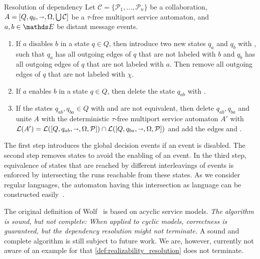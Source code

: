 \begin{definition}{Resolution of dependency}
\label{def:realizability_resolution}%
Let $\mathcal{C}=\{\mathcal{P}_{1},\ldots,\mathcal{P}_{n}\}$ be a collaboration, $A=[Q,q_{0},{\shortrightarrow},\Omega,\bigcup\mathcal{C}]$ be a $\tau$-free multiport service automaton, and $a,b\in \E$ be distant message events.
\begin{enumerate}
\item If $a$ disables $b$ in a state $q\in Q$, then introduce two new states $q_{a}$ and $q_{b}$ with ,  such that $q_{a}$ has all outgoing edges of $q$ that are not labeled with $b$ and $q_{b}$ has all outgoing edges of $q$ that are not labeled with $a$. Then remove all outgoing edges of $q$ that are not labeled with $\chi$.
\item If $a$ enables $b$ in a state $q\in Q$, then delete the state $q_{ab}$ with .
\item If the states $q_{ab},q_{ba}\in Q$ with  and  are not equivalent, then delete $q_{ab}, q_{ba}$ and unite $A$ with the deterministic $\tau$-free multiport service automaton $A'$ with $\mathcal{L}(A')=\mathcal{L}([Q,q_{ab},{\shortrightarrow},\Omega,\mathcal{P}])\cap\mathcal{L}([Q,q_{ba},{\shortrightarrow},\Omega,\mathcal{P}])$ and add the edges  and .
\end{enumerate}
\end{definition}

The first step introduces the global decision events if an event is disabled. The second step removes states to avoid the enabling of an event. In the third step, equivalence of states that are reached by different interleavings of events is enforced by intersecting the runs reachable from these states. As we consider regular languages, the automaton having this intersection as language can be constructed easily~\cite{HopcroftMU_1979}.

The original definition of Wolf~\cite{Schmidt_2005_emisa,Wolf_2008_topnoc} is based on acyclic service models. \emph{The algorithm is sound, but not complete: When applied to cyclic models, correctness is guaranteed, but the dependency resolution might not terminate.} A sound and complete algorithm is still subject to future work. We are, however, currently not aware of an example for that \autoref{def:realizability_resolution} does not terminate.

